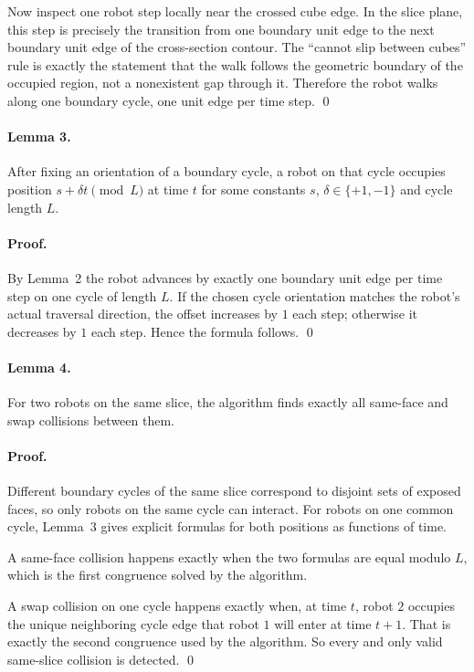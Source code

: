 \documentclass[11pt]{article}
\begin{document}
Now inspect one robot step locally near the crossed cube edge.
In the slice plane, this step is precisely the transition from one boundary unit edge to the next boundary unit edge of
the cross-section contour.
The ``cannot slip between cubes'' rule is exactly the statement that the walk follows the geometric boundary of the
occupied region, not a nonexistent gap through it.
Therefore the robot walks along one boundary cycle, one unit edge per time step. \qed

\paragraph{Lemma 3.}
After fixing an orientation of a boundary cycle, a robot on that cycle occupies position
$s + \delta t \pmod L$ at time $t$ for some constants $s$, $\delta \in \{+1,-1\}$ and cycle length $L$.

\paragraph{Proof.}
By Lemma~2 the robot advances by exactly one boundary unit edge per time step on one cycle of length $L$.
If the chosen cycle orientation matches the robot's actual traversal direction, the offset increases by $1$ each step;
otherwise it decreases by $1$ each step. Hence the formula follows. \qed

\paragraph{Lemma 4.}
For two robots on the same slice, the algorithm finds exactly all same-face and swap collisions between them.

\paragraph{Proof.}
Different boundary cycles of the same slice correspond to disjoint sets of exposed faces, so only robots on the same
cycle can interact.
For robots on one common cycle, Lemma~3 gives explicit formulas for both positions as functions of time.

A same-face collision happens exactly when the two formulas are equal modulo $L$, which is the first congruence solved
by the algorithm.

A swap collision on one cycle happens exactly when, at time $t$, robot $2$ occupies the unique neighboring cycle edge
that robot $1$ will enter at time $t+1$.
That is exactly the second congruence used by the algorithm.
So every and only valid same-slice collision is detected. \qed
\end{document}
